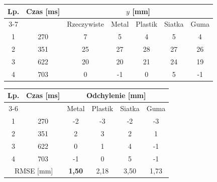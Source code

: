 \begin{tabular}{cc c cccc}
\toprule
Lp. & Czas [ms] & \multicolumn{5}{c}{$y$ [mm]} \\
\cmidrule(lr){3-7}
 &  & Rzeczywiste & Metal & Plastik & Siatka & Guma \\
\midrule
1 & 270 & 7 & 5 & 4 & 5 & 4 \\
2 & 351 & 25 & 27 & 28 & 27 & 26 \\
3 & 622 & 20 & 20 & 21 & 24 & 19 \\
4 & 703 & 0 & -1 & 0 & 5 & -1 \\
\bottomrule
\end{tabular}

\bigskip

\begin{tabular}{cc cccc}
\toprule
Lp. & Czas [ms] & \multicolumn{4}{c}{Odchylenie [mm]} \\
\cmidrule(lr){3-6}
 &  & Metal & Plastik & Siatka & Guma \\
\midrule
1 & 270 & -2 & -3 & -2 & -3 \\
2 & 351 & 2 & 3 & 2 & 1 \\
3 & 622 & 0 & 1 & 4 & -1 \\
4 & 703 & -1 & 0 & 5 & -1 \\
\midrule
\multicolumn{2}{c}{RMSE [mm]} & \textbf{1,50} & 2,18 & 3,50 & 1,73 \\
\bottomrule
\end{tabular}
